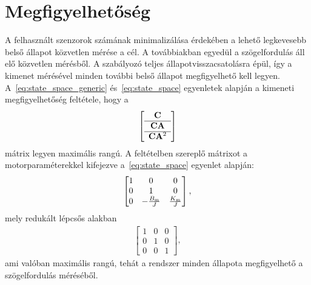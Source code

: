 \section{Megfigyelhetőség}\label{chap:observability}
A felhasznált szenzorok számának minimalizálása érdekében a lehető legkevesebb belső állapot közvetlen mérése 
a cél. A továbbiakban egyedül a szögelfordulás áll elő közvetlen mérésből. 
A szabályozó teljes állapotvisszacsatolásra épül, így a kimenet mérésével minden további belső állapot 
megfigyelhető kell legyen. 
A~\eqref{eq:state_space_generic} és~\eqref{eq:state_space} egyenletek alapján a kimeneti megfigyelhetőség feltétele, hogy a
\begin{align}
    \left[\begin{array}{c}
        \mathbf{C} \\ \hline
        \mathbf{CA} \\ \hline
        \mathbf{C} \mathbf{A}^2
    \end{array}\right]
\end{align}
mátrix legyen maximális rangú. A feltételben szereplő mátrixot a motorparaméterekkel kifejezve 
a~\eqref{eq:state_space} egyenlet alapján:
\begin{align}
    \begin{bmatrix}
        1 & 0 & 0 \\
        0 & 1 & 0 \\
        0 & -\frac{B_{\mathrm{m}}}{J} & \frac{K_{\mathrm{m}}}{J}
    \end{bmatrix},
\end{align}
mely redukált lépcsős alakban
\begin{align}
    \begin{bmatrix}
        1 & 0 & 0 \\
        0 & 1 & 0 \\
        0 & 0 & 1
    \end{bmatrix},
\end{align}
ami valóban maximális rangú, tehát a rendszer minden állapota megfigyelhető a szögelfordulás méréséből.

